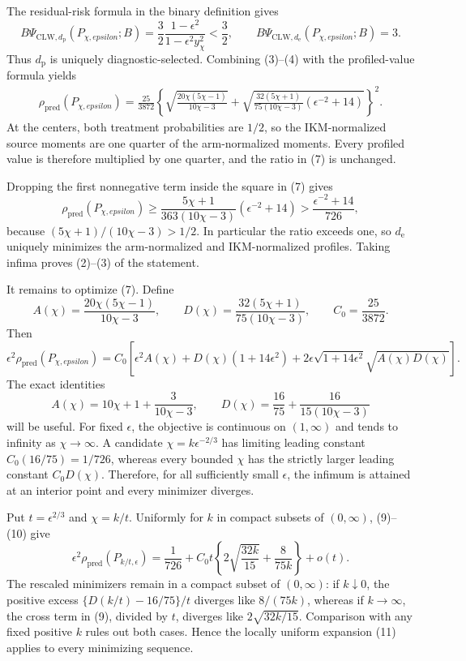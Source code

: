 The residual-risk formula in the binary definition gives
\[
 B\Psi_{\mathrm{CLW},d_{\mathrm p}}(P_{\chi,epsilon};B)
 =\frac32\frac{1-\epsilon^2}{1-\epsilon^2y_\chi^2}
 <\frac32,
 \qquad
 B\Psi_{\mathrm{CLW},d_{\mathrm e}}(P_{\chi,epsilon};B)=3. \tag{6}
\]
Thus \(d_{\mathrm p}\) is uniquely diagnostic-selected.  Combining (3)--(4) with the profiled-value formula yields
\[
\begin{aligned}
 \rho_{\mathrm{pred}}(P_{\chi,epsilon})
 =\frac{25}{3872}\left\{
 \sqrt{\frac{20\chi(5\chi-1)}{10\chi-3}}
 +\sqrt{\frac{32(5\chi+1)}{75(10\chi-3)}
 (\epsilon^{-2}+14)}\right\}^2. \tag{7}
\end{aligned}
\]
At the centers, both treatment probabilities are \(1/2\), so the IKM-normalized source moments are one quarter of the arm-normalized moments.  Every profiled value is therefore multiplied by one quarter, and the ratio in (7) is unchanged.

Dropping the first nonnegative term inside the square in (7) gives
\[
 \rho_{\mathrm{pred}}(P_{\chi,epsilon})
 \ge\frac{5\chi+1}{363(10\chi-3)}(\epsilon^{-2}+14)
 >\frac{\epsilon^{-2}+14}{726}, \tag{8}
\]
because \((5\chi+1)/(10\chi-3)>1/2\).  In particular the ratio exceeds one, so \(d_{\mathrm e}\) uniquely minimizes the arm-normalized and IKM-normalized profiles.  Taking infima proves (2)--(3) of the statement.

It remains to optimize (7).  Define
\[
 A(\chi)=\frac{20\chi(5\chi-1)}{10\chi-3},
 \qquad
 D(\chi)=\frac{32(5\chi+1)}{75(10\chi-3)},
 \qquad C_0=\frac{25}{3872}.
\]
Then
\[
 \epsilon^2\rho_{\mathrm{pred}}(P_{\chi,epsilon})
 =C_0\left[\epsilon^2A(\chi)
 +D(\chi)(1+14\epsilon^2)
 +2\epsilon\sqrt{1+14\epsilon^2}\sqrt{A(\chi)D(\chi)}\right]. \tag{9}
\]
The exact identities
\[
 A(\chi)=10\chi+1+\frac3{10\chi-3},
 \qquad
 D(\chi)=\frac{16}{75}+\frac{16}{15(10\chi-3)} \tag{10}
\]
will be useful.  For fixed \(\epsilon\), the objective is continuous on \((1,\infty)\) and tends to infinity as \(\chi\to\infty\).  A candidate \(\chi=k\epsilon^{-2/3}\) has limiting leading constant \(C_0(16/75)=1/726\), whereas every bounded \(\chi\) has the strictly larger leading constant \(C_0D(\chi)\).  Therefore, for all sufficiently small \(\epsilon\), the infimum is attained at an interior point and every minimizer diverges.

Put \(t=\epsilon^{2/3}\) and \(\chi=k/t\).  Uniformly for \(k\) in compact subsets of \((0,\infty)\), (9)--(10) give
\[
 \epsilon^2\rho_{\mathrm{pred}}(P_{k/t,\epsilon})
 =\frac1{726}+C_0t\left\{
 2\sqrt{\frac{32k}{15}}+\frac8{75k}\right\}+o(t). \tag{11}
\]
The rescaled minimizers remain in a compact subset of \((0,\infty)\): if \(k\downarrow0\), the positive excess \(\{D(k/t)-16/75\}/t\) diverges like \(8/(75k)\), whereas if \(k\to\infty\), the cross term in (9), divided by \(t\), diverges like \(2\sqrt{32k/15}\).  Comparison with any fixed positive \(k\) rules out both cases.  Hence the locally uniform expansion (11) applies to every minimizing sequence.

